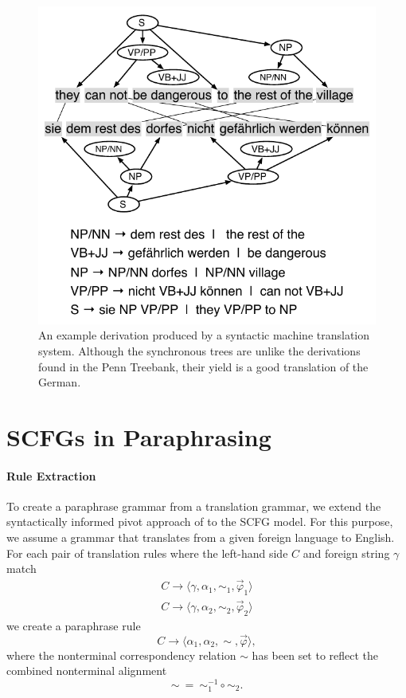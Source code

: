 \documentclass[11pt]{article}
\begin{document}
\begin{figure}[t]
\begin{center}
\includegraphics[width=0.99\linewidth]{figures/example_translation.pdf}
\end{center}
\caption{An example derivation produced by a syntactic machine translation system.  Although the synchronous trees are unlike the derivations found in the Penn Treebank, their yield is a good translation of the German.}
\label{example_translation}
\end{figure}


\section{SCFGs in Paraphrasing} \label{acquisition}


\paragraph{Rule Extraction}

To create a paraphrase grammar from a translation grammar, we extend
the syntactically informed pivot approach of
 to the SCFG model. For this purpose, we
assume a grammar that translates from a given foreign language to
English. For each pair of translation rules where the left-hand side
$C$ and foreign string $\gamma$ match
\begin{eqnarray*}
C \rightarrow \langle \gamma, \alpha_1, \sim_1, \vec{\varphi}_1 \rangle \\
C \rightarrow \langle \gamma, \alpha_2, \sim_2, \vec{\varphi}_2 \rangle
\end{eqnarray*}
we create a paraphrase rule
\begin{equation*}
C \rightarrow \langle \alpha_1, \alpha_2, \sim, \vec{\varphi} \rangle ,
\end{equation*}
where the nonterminal correspondency relation $\sim$ has been set to
reflect the combined nonterminal alignment
\begin{equation*}
\sim ~ = ~ \sim_1^{-1} \circ \sim_2 .
\end{equation*}
\end{document}
